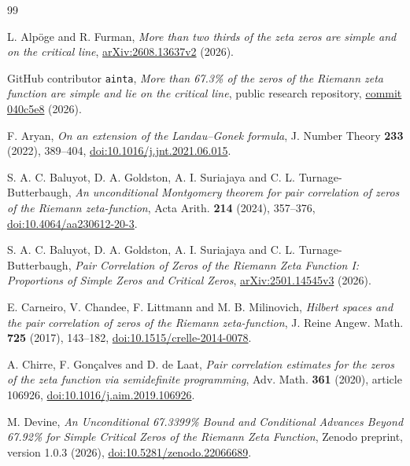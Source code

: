 \begin{thebibliography}{99}
\raggedright

 L. Alp\"oge and R. Furman,
\emph{More than two thirds of the zeta zeros are simple and on the critical line},
\href{https://arxiv.org/abs/2608.13637v2}{arXiv:2608.13637v2} (2026).

 GitHub contributor \texttt{ainta},
\emph{More than 67.3\% of the zeros of the Riemann zeta function
are simple and lie on the critical line}, public research repository,
\href{https://github.com/ainta/zeta-simple-zeros/tree/040c5e899e658aed7b56a2a87f501798fe10761d}{commit 040c5e8} (2026).

 F. Aryan,
\emph{On an extension of the Landau--Gonek formula},
J. Number Theory \textbf{233} (2022), 389--404,
\href{https://doi.org/10.1016/j.jnt.2021.06.015}{doi:10.1016/j.jnt.2021.06.015}.

 S. A. C. Baluyot, D. A. Goldston,
A. I. Suriajaya and C. L. Turnage-Butterbaugh,
\emph{An unconditional Montgomery theorem for pair correlation of zeros
of the Riemann zeta-function}, Acta Arith. \textbf{214} (2024), 357--376,
\href{https://doi.org/10.4064/aa230612-20-3}{doi:10.4064/aa230612-20-3}.

 S. A. C. Baluyot, D. A. Goldston,
A. I. Suriajaya and C. L. Turnage-Butterbaugh,
\emph{Pair Correlation of Zeros of the Riemann Zeta Function I:
Proportions of Simple Zeros and Critical Zeros},
\href{https://arxiv.org/abs/2501.14545v3}{arXiv:2501.14545v3} (2026).

 E. Carneiro, V. Chandee, F. Littmann and M. B. Milinovich,
\emph{Hilbert spaces and the pair correlation of zeros of the
Riemann zeta-function}, J. Reine Angew. Math. \textbf{725} (2017),
143--182,
\href{https://doi.org/10.1515/crelle-2014-0078}{doi:10.1515/crelle-2014-0078}.

 A. Chirre, F. Gon\c{c}alves and D. de Laat,
\emph{Pair correlation estimates for the zeros of the zeta function
via semidefinite programming}, Adv. Math. \textbf{361} (2020),
article 106926,
\href{https://doi.org/10.1016/j.aim.2019.106926}{doi:10.1016/j.aim.2019.106926}.

 M. Devine,
\emph{An Unconditional 67.3399\% Bound and Conditional Advances Beyond
67.92\% for Simple Critical Zeros of the Riemann Zeta Function},
Zenodo preprint, version 1.0.3 (2026),
\href{https://doi.org/10.5281/zenodo.22066689}{doi:10.5281/zenodo.22066689}.


\end{thebibliography}
